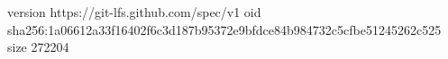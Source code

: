 version https://git-lfs.github.com/spec/v1
oid sha256:1a06612a33f16402f6c3d187b95372e9bfdce84b984732c5cfbe51245262c525
size 272204
